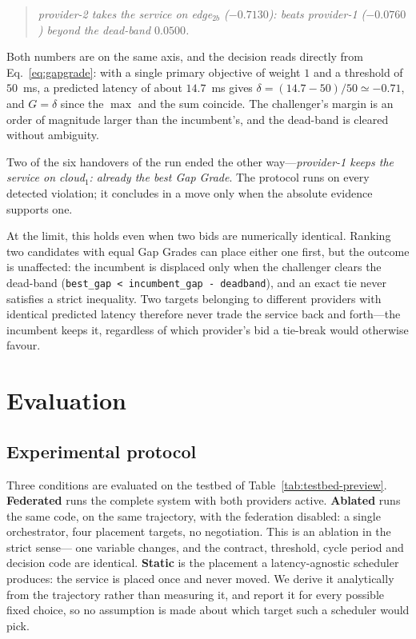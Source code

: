 \documentclass[conference]{IEEEtran}
\begin{document}
\begin{quote}\itshape\footnotesize
provider-2 takes the service on edge$_{2b}$ ($-0.7130$): beats provider-1
($-0.0760$) beyond the dead-band $0.0500$.
\end{quote}

Both numbers are on the same axis, and the decision reads directly from
Eq.~\eqref{eq:gapgrade}: with a single primary objective of weight $1$ and a
threshold of $50$~ms, a predicted latency of about $14.7$~ms gives
$\delta = (14.7 - 50)/50 \simeq -0.71$, and $G = \delta$ since the $\max$ and
the sum coincide. The challenger's margin is an order of magnitude larger than
the incumbent's, and the dead-band is cleared without ambiguity.

Two of the six handovers of the run ended the other way---\emph{provider-1
keeps the service on cloud$_1$: already the best Gap Grade}. The protocol runs
on every detected violation; it concludes in a move only when the absolute
evidence supports one.

At the limit, this holds even when two bids are numerically identical.
Ranking two candidates with equal Gap Grades can place either one first, but
the outcome is unaffected: the incumbent is displaced only when the challenger
clears the dead-band (\texttt{best\_gap < incumbent\_gap - deadband}), and an
exact tie never satisfies a strict inequality. Two targets belonging to
different providers with identical predicted latency therefore never trade
the service back and forth---the incumbent keeps it, regardless of which
provider's bid a tie-break would otherwise favour.

\section{Evaluation}
\label{sec:eval}
\subsection{Experimental protocol}
\label{sec:protocol}

Three conditions are evaluated on the testbed of
Table~\ref{tab:testbed-preview}. \textbf{Federated} runs the complete system
with both providers active. \textbf{Ablated} runs the same code, on the same
trajectory, with the federation disabled: a single orchestrator, four
placement targets, no negotiation. This is an ablation in the strict sense---
one variable changes, and the contract, threshold, cycle period and decision
code are identical. \textbf{Static} is the placement a latency-agnostic
scheduler produces: the service is placed once and never moved. We derive it
analytically from the trajectory rather than measuring it, and report it for
every possible fixed choice, so no assumption is made about which target such
a scheduler would pick.
\end{document}
